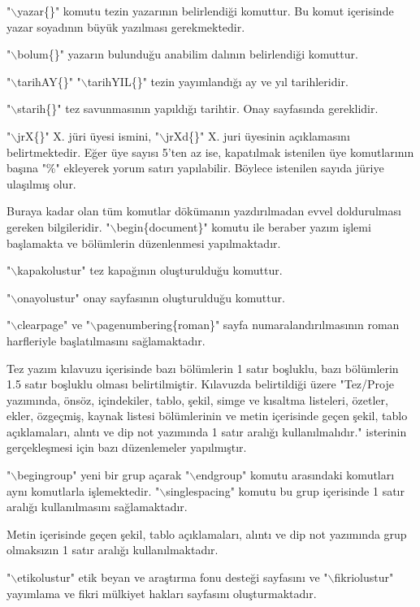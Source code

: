 "$\backslash$yazar\{\}" komutu tezin yazarının belirlendiği komuttur. Bu komut içerisinde yazar soyadının büyük yazılması gerekmektedir.

"$\backslash$bolum\{\}" yazarın bulunduğu anabilim dalının belirlendiği komuttur. 

"$\backslash$tarihAY\{\}" "$\backslash$tarihYIL\{\}" tezin yayımlandığı ay ve yıl tarihleridir.

"$\backslash$starih\{\}" tez savunmasının yapıldığı tarihtir. Onay sayfasında gereklidir. 

"$\backslash$jrX\{\}" X. jüri üyesi ismini, "$\backslash$jrXd\{\}" X. juri üyesinin açıklamasını belirtmektedir. Eğer üye sayısı 5'ten az ise, kapatılmak istenilen üye komutlarının başına "\%" ekleyerek yorum satırı yapılabilir. Böylece istenilen sayıda jüriye ulaşılmış olur. 

Buraya kadar olan tüm komutlar dökümanın yazdırılmadan evvel doldurulması gereken bilgileridir. "$\backslash$begin\{document\}" komutu ile beraber yazım işlemi başlamakta ve bölümlerin düzenlenmesi yapılmaktadır. 

"$\backslash$kapakolustur" tez kapağının oluşturulduğu komuttur. 

"$\backslash$onayolustur" onay sayfasının oluşturulduğu komuttur. 

"$\backslash$clearpage" ve "$\backslash$pagenumbering\{roman\}" sayfa numaralandırılmasının roman harfleriyle başlatılmasını sağlamaktadır. 

Tez yazım kılavuzu içerisinde bazı bölümlerin 1 satır boşluklu, bazı bölümlerin 1.5 satır boşluklu olması belirtilmiştir. Kılavuzda belirtildiği üzere "Tez/Proje yazımında, önsöz, içindekiler, tablo, şekil, simge ve kısaltma listeleri, özetler, ekler, özgeçmiş, kaynak listesi bölümlerinin ve metin içerisinde geçen şekil, tablo açıklamaları, alıntı ve dip not yazımında 1 satır aralığı kullanılmalıdır." isterinin gerçekleşmesi için bazı düzenlemeler yapılmıştır. 

"$\backslash$begingroup" yeni bir grup açarak "$\backslash$endgroup" komutu arasındaki komutları aynı komutlarla işlemektedir. "$\backslash$singlespacing" komutu bu grup içerisinde 1 satır aralığı kullanılmasını sağlamaktadır. 

Metin içerisinde geçen şekil, tablo açıklamaları, alıntı ve dip not yazımında grup olmaksızın 1 satır aralığı kullanılmaktadır. 

"$\backslash$etikolustur" etik beyan ve araştırma fonu desteği sayfasını ve "$\backslash$fikriolustur" yayımlama ve fikri mülkiyet hakları sayfasını oluşturmaktadır. 

